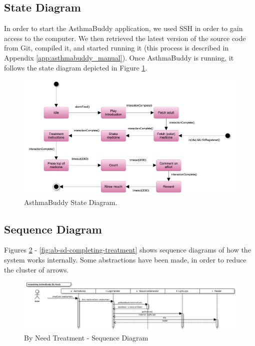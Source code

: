 \subsection{State Diagram}
\label{sec:statediagram}

In order to start the AsthmaBuddy application, we used SSH in order to gain access to the computer. We then retrieved the latest version of the source code from Git, compiled it, and started running it (this process is described in Appendix \ref{app:asthmabuddy_manual}). Once AsthmaBuddy is running, it follows the state diagram depicted in Figure \ref{fig:asthmabuddy_statediagram}.  
  

\begin{figure}[H] 
	\centering
		\includegraphics[width=0.7\paperwidth]{Pictures/statediagram.png}
	\caption{AsthmaBuddy State Diagram.}
	\label{fig:asthmabuddy_statediagram}
\end{figure}

\subsection{Sequence Diagram}
Figures \ref{fig:ab-sd-byneed} - \ref{fig:ab-sd-completing-treatment} shows sequence diagrams of how the system works internally. Some abstractions have been made, in order to reduce the cluster of arrows. 

\begin{figure}
	\centering
		\includegraphics[scale=0.6]{Pictures/sd/sd-byneed.png}
	\caption{By Need Treatment - Sequence Diagram}
	\label{fig:ab-sd-byneed}
\end{figure}

